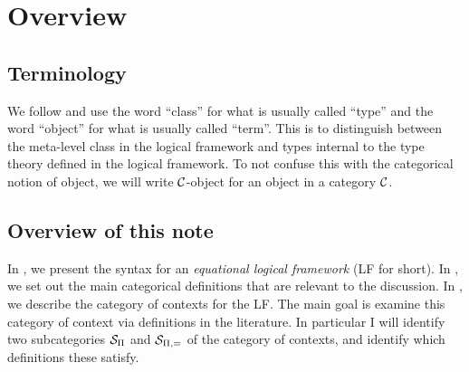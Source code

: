 \section{Overview}

\subsection{Terminology}

We follow \cite{harper2021equational} and use the word ``class'' for what is usually called ``type'' and
the word ``object'' for what is usually called ``term''.
This is to distinguish between the meta-level class in the logical framework
and types internal to the type theory defined in the logical framework.
To not confuse this with the categorical notion of object,
we will write $\mathcal{C}$-object for an object in a category $\mathcal{C}$.

\subsection{Overview of this note}

In , we present the syntax for
an \textit{equational logical framework} (LF for short).
In , we set out the main categorical
definitions that are relevant to the discussion.
In , we describe the category of contexts
for the LF.
The main goal is examine this category of context via definitions
in the literature.
In particular I will identify two subcategories $\mathcal{S}_{\Pi}$ and $\mathcal{S}_{\Pi,=}$
of the category of contexts, and identify which definitions these satisfy.

